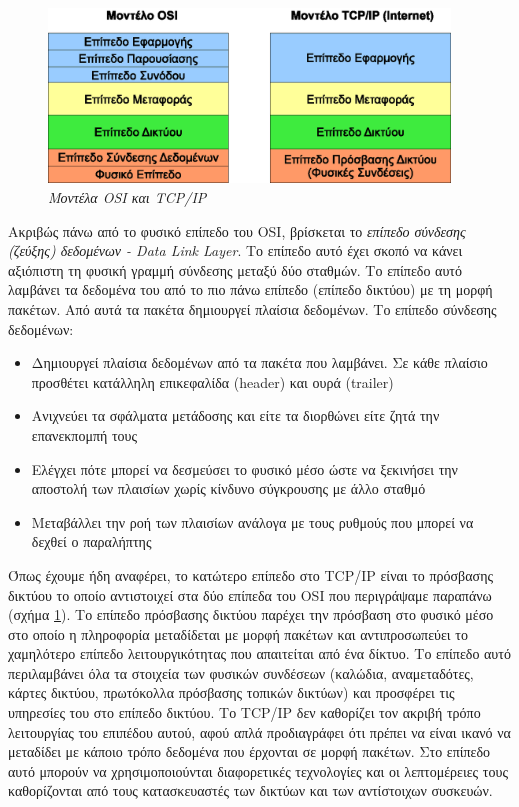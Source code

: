 \begin{figure}[!ht]
  \centering
  \includegraphics[width=0.95\textwidth]{images/chapter2/2-1}
  \caption {\textsl{Μοντέλα OSI και TCP/IP}}
  \label{2-1}
\end{figure}

Ακριβώς πάνω από το φυσικό επίπεδο του OSI, βρίσκεται το \emph{επίπεδο σύνδεσης (ζεύξης) δεδομένων - Data Link Layer}. Το επίπεδο αυτό έχει σκοπό να κάνει αξιόπιστη τη φυσική γραμμή σύνδεσης μεταξύ δύο σταθμών. Το επίπεδο αυτό λαμβάνει τα δεδομένα του από το πιο πάνω επίπεδο (επίπεδο δικτύου) με τη μορφή πακέτων. Από αυτά τα πακέτα δημιουργεί πλαίσια δεδομένων.  Το επίπεδο σύνδεσης δεδομένων:

\begin{itemize}
\item Δημιουργεί πλαίσια δεδομένων από τα πακέτα που λαμβάνει. Σε κάθε πλαίσιο προσθέτει κατάλληλη επικεφαλίδα (header) και ουρά (trailer)
\item Ανιχνεύει τα σφάλματα μετάδοσης και είτε τα διορθώνει είτε ζητά την επανεκπομπή τους
\item Ελέγχει πότε μπορεί να δεσμεύσει το φυσικό μέσο ώστε να ξεκινήσει την αποστολή των πλαισίων χωρίς κίνδυνο σύγκρουσης με άλλο σταθμό
\item Μεταβάλλει την ροή των πλαισίων ανάλογα με τους ρυθμούς που μπορεί να δεχθεί ο παραλήπτης
\end{itemize}

Όπως έχουμε ήδη αναφέρει, το κατώτερο επίπεδο στο TCP/IP είναι το πρόσβασης δικτύου το οποίο αντιστοιχεί στα δύο επίπεδα του OSI που περιγράψαμε παραπάνω (σχήμα \ref{2-1}). Το επίπεδο πρόσβασης δικτύου παρέχει την πρόσβαση στο φυσικό μέσο στο οποίο η πληροφορία μεταδίδεται με μορφή πακέτων και αντιπροσωπεύει το χαμηλότερο επίπεδο λειτουργικότητας που απαιτείται από ένα δίκτυο. Το επίπεδο αυτό περιλαμβάνει όλα τα στοιχεία των φυσικών συνδέσεων (καλώδια, αναμεταδότες, κάρτες δικτύου, πρωτόκολλα πρόσβασης τοπικών δικτύων) και προσφέρει τις υπηρεσίες του στο επίπεδο δικτύου. Το TCP/IP δεν καθορίζει τον ακριβή τρόπο λειτουργίας του επιπέδου αυτού, αφού απλά προδιαγράφει ότι πρέπει να είναι ικανό να μεταδίδει με κάποιο τρόπο δεδομένα που έρχονται σε μορφή πακέτων. Στο επίπεδο αυτό μπορούν να χρησιμοποιούνται διαφορετικές τεχνολογίες και οι λεπτομέρειες τους καθορίζονται από τους κατασκευαστές των δικτύων και των αντίστοιχων συσκευών.